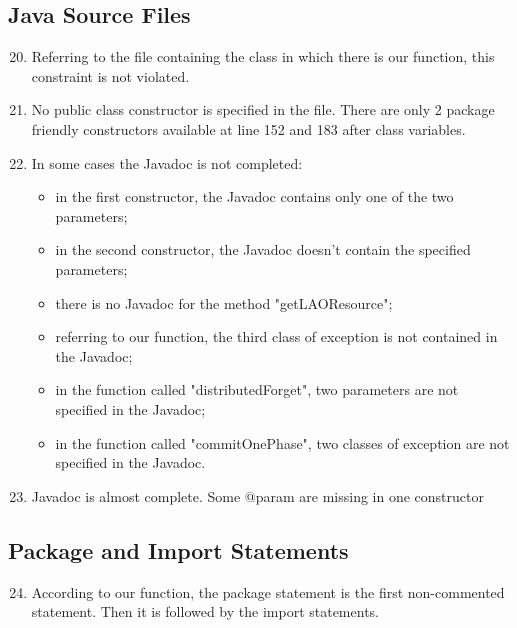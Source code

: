 \subsection{Java Source Files}
\begin{enumerate}
	\setcounter{enumi}{19}
	\item Referring to the file containing the class in which there is our function, this constraint is not violated.
	\item No public class constructor is specified in the file. There are only 2 package friendly constructors available at line 152 and 183 after class variables.
	\item In some cases the Javadoc is not completed:
	    \begin{itemize}
	        \item in the first constructor, the Javadoc contains only one of the two parameters;
	        \item in the second constructor, the Javadoc doesn't contain the specified parameters;
	        \item there is no Javadoc for the method "getLAOResource";
	        \item referring to our function, the third class of exception is not contained in the Javadoc;
	        \item in the function called "distributedForget", two parameters are not specified in the Javadoc;
	        \item in the function called "commitOnePhase", two classes of exception are not specified in the Javadoc.
	    \end{itemize}
	\item Javadoc is almost complete. Some @param are missing in one constructor
\end{enumerate}
\subsection{Package and Import Statements}
\begin{enumerate}
	\setcounter{enumi}{23}
	\item According to our function, the package statement is the first non-commented statement. Then it is followed by the import statements.
\end{enumerate}
